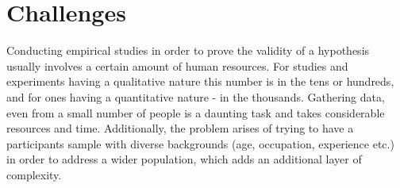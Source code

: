 \chapter{Challenges}
\label{chap:challenges}

Conducting empirical studies in order to prove the validity of a hypothesis usually involves a certain amount of human resources. For studies and experiments having a qualitative nature this number is in the tens or hundreds, and for ones having a quantitative nature - in the thousands. Gathering data, even from a small number of people is a daunting task and takes considerable resources and time. Additionally, the problem arises of trying to have a participants sample with diverse backgrounds (age, occupation, experience etc.) in order to address a wider population, which adds an additional layer of complexity. 

